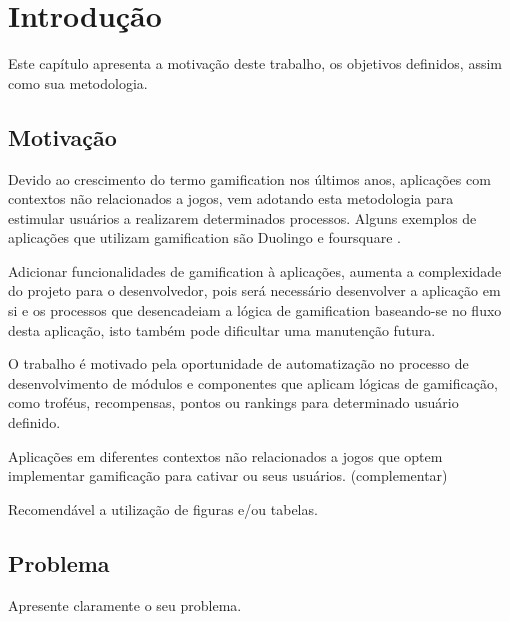 \chapter[Introdução]{Introdução}
\par Este capítulo apresenta a motivação deste trabalho, os objetivos definidos, assim como sua metodologia.

\section{Motivação}

\par Devido ao crescimento do termo gamification nos últimos anos, \cite{groh2012gamification} aplicações com contextos não relacionados a jogos, vem adotando esta metodologia para estimular usuários a realizarem determinados processos. Alguns exemplos de aplicações que utilizam gamification são Duolingo \cite{melo2016eficiencia} e foursquare \cite{huotari2012defining}.

\par Adicionar funcionalidades de gamification à aplicações, aumenta a complexidade do projeto para o desenvolvedor, pois será necessário desenvolver a aplicação em si e os processos que desencadeiam a lógica de gamification baseando-se no fluxo desta aplicação, isto também pode dificultar uma manutenção futura.

\par O trabalho é motivado pela oportunidade de automatização no processo de desenvolvimento de módulos e componentes que aplicam lógicas de gamificação, como troféus, recompensas, pontos ou rankings para determinado usuário definido.
\par Aplicações em diferentes contextos não relacionados a jogos que optem implementar gamificação para cativar ou seus usuários. (complementar)
\par Recomendável a utilização de figuras e/ou tabelas.

\section{Problema}
\par Apresente claramente o seu problema.

